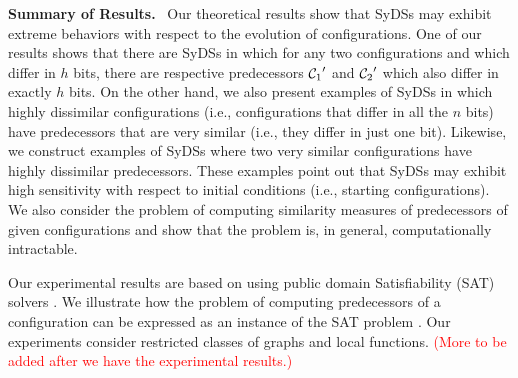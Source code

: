 \noindent
\textbf{Summary of Results.}~ 
Our theoretical results show that SyDSs may exhibit
extreme behaviors with respect to the evolution of configurations.
One of our results shows that there are SyDSs in which
for any two configurations \calcone{} and \calctwo{} 
which differ in $h$ bits, there are respective predecessors 
$\mbox{$\mathcal{C}_{1}$}'$ and $\mbox{$\mathcal{C}_{2}$}'$ which also differ in exactly $h$ bits.
On the other hand, we also present examples of SyDSs in which
highly dissimilar configurations (i.e., configurations that differ
in all the $n$ bits) have predecessors that are very similar (i.e., they
differ in just one bit).
Likewise, we construct examples of SyDSs where two very similar 
configurations have highly dissimilar predecessors.
These examples point out that SyDSs may exhibit high sensitivity
with respect to initial conditions (i.e., starting configurations).
We also consider the problem of computing similarity
measures of predecessors of given configurations and show that
the problem is, in general, computationally intractable.

Our experimental results are based on using public domain Satisfiability
(SAT) solvers \cite{sat-live}.
We illustrate how the problem of computing predecessors of a
configuration can be expressed as an instance of the SAT
problem \cite{GJ-1979}.
Our experiments consider restricted classes of graphs and local functions.
\textcolor{red}{(More to be added after we have the experimental results.)}



\smallskip

